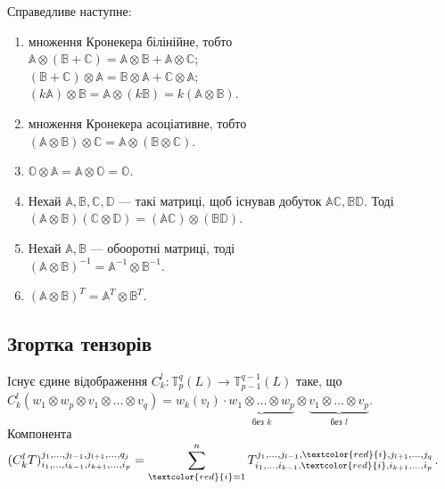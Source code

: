 \documentclass{math_library}
\begin{document}
\begin{proposition}
Справедливе наступне:
\begin{enumerate}[nosep,wide=0pt,label={\arabic*)}]
\item множення Кронекера білінійне, тобто \\
$\mathbb{A} \otimes (\mathbb{B} + \mathbb{C}) = \mathbb{A} \otimes \mathbb{B} + \mathbb{A} \otimes \mathbb{C}$; \\
$(\mathbb{B} + \mathbb{C}) \otimes \mathbb{A} = \mathbb{B} \otimes \mathbb{A} + \mathbb{C} \otimes \mathbb{A}$; \\
$(k \mathbb{A}) \otimes \mathbb{B} = \mathbb{A} \otimes (k \mathbb{B}) = k (\mathbb{A} \otimes \mathbb{B})$.
\item множення Кронекера асоціативне, тобто \\
$(\mathbb{A} \otimes \mathbb{B}) \otimes \mathbb{C} = \mathbb{A} \otimes (\mathbb{B} \otimes \mathbb{C})$.

\item $\mathbb{O} \otimes \mathbb{A} = \mathbb{A} \otimes \mathbb{O} = \mathbb{O}$.

\item Нехай $\mathbb{A},\mathbb{B},\mathbb{C},\mathbb{D}$ --- такі матриці, щоб існував добуток $\mathbb{A} \mathbb{C}, \mathbb{B} \mathbb{D}$. Тоді \\
$(\mathbb{A} \otimes \mathbb{B}) (\mathbb{C} \otimes \mathbb{D}) = (\mathbb{A} \mathbb{C}) \otimes (\mathbb{B} \mathbb{D}).$

\item Нехай $\mathbb{A}, \mathbb{B}$ --- обооротні матриці, тоді \\
$(\mathbb{A} \otimes \mathbb{B})^{-1} = \mathbb{A}^{-1} \otimes \mathbb{B}^{-1}$.

\item $(\mathbb{A} \otimes \mathbb{B})^T = \mathbb{A}^T \otimes \mathbb{B}^T$.
\end{enumerate}
\end{proposition}

\subsection{Згортка тензорів}
\begin{proposition}
Існує єдине відображення $C_k^l \colon \mathbb{T}_p^q(L) \to \mathbb{T}_{p-1}^{q-1}(L)$ таке, що \\
$C_k^l(w_1 \otimes w_p \otimes v_1 \otimes \dots \otimes v_q) = w_k(v_l) \cdot \underbrace{w_1 \otimes \dots \otimes w_p}_{\text{без }k} \otimes \underbrace{v_1 \otimes \dots \otimes v_p}_{\text{без }l}$.\\
Компонента $(C_k^l T)_{i_1,\dots,i_{k-1},i_{k+1},\dots,i_p}^{j_1,\dots,j_{l-1},j_{l+1},\dots,q_j} = \displaystyle\sum_{\textcolor{red}{i}=1}^n T_{i_1,\dots,i_{k-1},\textcolor{red}{i},i_{k+1},\dots,i_p}^{j_1,\dots,j_{l-1},\textcolor{red}{i},j_{l+1},\dots,j_q}$.
\end{proposition}
\end{document}

